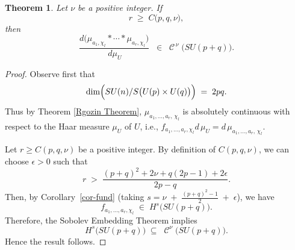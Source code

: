 \documentclass[11pt,a4paper]{amsart}
\DeclareMathOperator{\C}{\mathcal{C}}
\newtheorem{theorem}{Theorem}[section]
\theoremstyle{definition}
\numberwithin{equation}{section}
\begin{document}
\begin{theorem}\label{main}
Let \(\nu\) be a positive integer. If 
\[
   r \;\ge\; C\!\bigl(p,q,\nu\bigr),
\]
then 
\[
   \frac{d\bigl(\mu_{a_1,\chi_l} \ast \cdots \ast \mu_{a_r,\chi_l}\bigr)}{\,d\mu_U}
   \;\;\in\; \C^{\,\nu}\bigl(SU(p+q)\bigr).
\]
\end{theorem}

\begin{proof}
Observe first that
\[
   \dim\Bigl(SU(n)/S\bigl(U(p)\times U(q)\bigr)\Bigr) \;=\; 2pq.
\] Thus by Theorem \ref{Rgozin Theorem}, $ \mu _{a_1, \dots , a_r, \, \chi_l}$ is absolutely continuous with respect to the Haar measure $\mu_U$ of  $U$,  i.e., $ f_{a_1,\dots ,a_r,\chi_l} d\,\mu_U=d\,\mu_{ a_1,\dots ,a_r, \, \chi_l}.$
 

Let \(r \ge C(p,q,\nu)\) be a positive integer. By definition of \(C(p,q,\nu)\), we can choose  \(\epsilon>0\) such that
\[
   r 
   \;>\; \frac{(p+q)^{2} + 2\nu + q(2p - 1) + 2\epsilon}{\,2p - q\,}.
\]
Then, by Corollary~\ref{cor-fund} (taking
\(\displaystyle s = \nu \;+\; \frac{(p+q)^2 - 1}{2} \;+\;\epsilon\)),
we have
\[
   f_{a_{1}, \dots, a_{r}, \chi_l} 
   \;\in\; H^s\bigl(SU(p+q)\bigr).
\]
 Therefore,  the Sobolev Embedding Theorem implies
\[
   H^s\bigl(SU(p+q)\bigr)
   \;\subseteq\; \C^{\nu}\bigl(SU(p+q) \bigr).
\]
Hence the result follows.
\end{proof}
\end{document}
